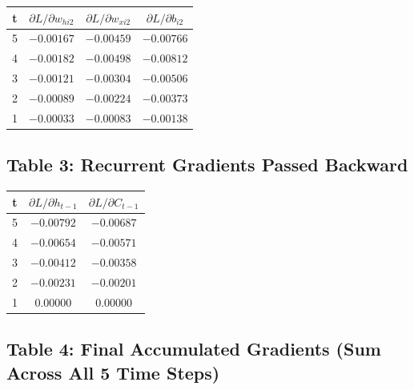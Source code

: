 \documentclass[12pt]{article}
\begin{document}
\begin{center}
\scriptsize
\begin{tabular}{cccc}
\toprule
\textbf{t} & \textbf{$\partial L / \partial w_{hi2}$} & \textbf{$\partial L / \partial w_{xi2}$} & \textbf{$\partial L / \partial b_{i2}$} \\
\midrule
5 & $-0.00167$ & $-0.00459$ & $-0.00766$ \\
4 & $-0.00182$ & $-0.00498$ & $-0.00812$ \\
3 & $-0.00121$ & $-0.00304$ & $-0.00506$ \\
2 & $-0.00089$ & $-0.00224$ & $-0.00373$ \\
1 & $-0.00033$ & $-0.00083$ & $-0.00138$ \\
\bottomrule
\end{tabular}
\end{center}

\subsection*{Table 3: Recurrent Gradients Passed Backward}

\begin{center}
\scriptsize
\begin{tabular}{ccc}
\toprule
\textbf{t} & \textbf{$\partial L / \partial h_{t-1}$} & \textbf{$\partial L / \partial C_{t-1}$} \\
\midrule
5 & $-0.00792$ & $-0.00687$ \\
4 & $-0.00654$ & $-0.00571$ \\
3 & $-0.00412$ & $-0.00358$ \\
2 & $-0.00231$ & $-0.00201$ \\
1 & $0.00000$ & $0.00000$ \\
\bottomrule
\end{tabular}
\end{center}

\subsection*{Table 4: Final Accumulated Gradients (Sum Across All 5 Time Steps)}
\end{document}
